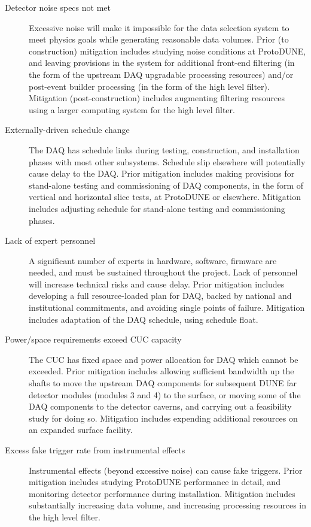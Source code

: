 \begin{description}
\item[Detector noise specs not met] Excessive noise will make it
  impossible for the data selection system to meet physics goals while
  generating reasonable data volumes. Prior (to construction) mitigation includes
  studying noise conditions at ProtoDUNE, and leaving provisions in the
  system for additional front-end filtering (in the form of the
  upstream DAQ upgradable processing resources) and/or post-event builder processing (in
  the form of the high level filter). Mitigation (post-construction) includes augmenting
  filtering resources using a larger computing system for the high
  level filter.

\item[Externally-driven schedule change] The DAQ has schedule links during
  testing, construction, and installation phases with most other
  subsystems. Schedule slip elsewhere will potentially cause
  delay to the DAQ. Prior mitigation includes making provisions for
  stand-alone testing and commissioning of DAQ components, in the form
  of vertical and horizontal slice tests, at ProtoDUNE or
  elsewhere. Mitigation includes adjusting schedule for stand-alone
  testing and commissioning phases. 

\item[Lack of expert personnel] A significant number of experts in
  hardware, software, firmware are needed, and must be sustained
  throughout the project. Lack of personnel will increase technical
  risks and cause delay. Prior mitigation includes developing a full
  resource-loaded plan for DAQ, backed by national and institutional
  commitments, and avoiding single points of failure. Mitigation
  includes adaptation of the DAQ schedule, using schedule float.

\item[Power/space requirements exceed CUC capacity] The CUC has fixed
  space and power allocation for DAQ 
which cannot be exceeded.  Prior mitigation includes allowing
sufficient bandwidth up the shafts to move the upstream DAQ components for
subsequent DUNE far detector modules (modules 3 and 4) to the
surface, or moving some of the DAQ components to the detector caverns,
and carrying out a feasibility study for doing so. 
Mitigation includes expending additional resources on an
expanded surface facility.

\item[Excess fake trigger rate from instrumental effects] Instrumental
  effects (beyond excessive noise) can cause fake triggers. Prior
  mitigation includes studying ProtoDUNE performance in detail, and monitoring detector
  performance during installation. Mitigation includes substantially increasing
  data volume, and increasing processing resources in the high level
  filter.


\end{description}
